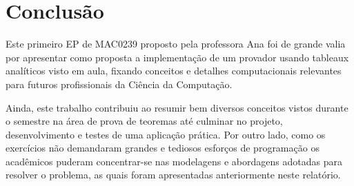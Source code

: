 \documentclass[brazil,times]{abnt}
\begin{document}
\section*{Conclusão}
	Este primeiro EP de MAC0239 proposto pela professora Ana foi de
	grande valia por apresentar como proposta a implementação de um provador
	usando tableaux analíticos visto em aula, fixando conceitos e detalhes
	computacionais relevantes para futuros profissionais da Ciência da Computação.

	Ainda, este trabalho contribuiu ao resumir bem diversos conceitos vistos
	durante o semestre na área de prova de teoremas até culminar no
	projeto, desenvolvimento e testes de uma aplicação prática. Por outro lado,
	como os exercícios não demandaram grandes e tediosos esforços de programação os
	acadêmicos puderam concentrar-se nas modelagens e abordagens adotadas para
	resolver o problema, as quais foram apresentadas anteriormente neste relatório.


% 
% 
\end{document}
